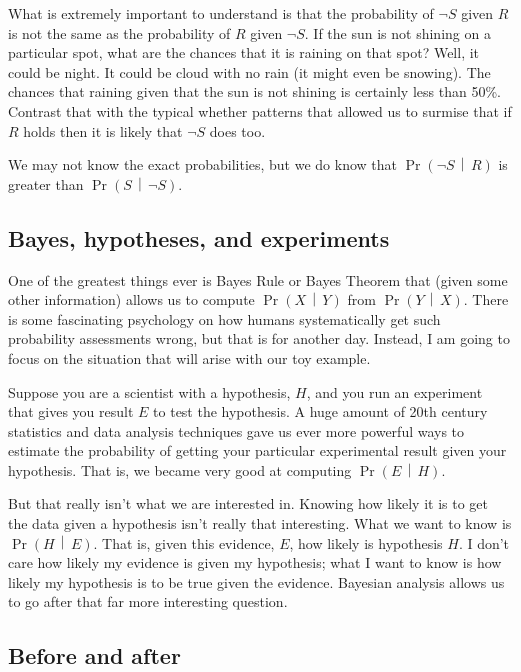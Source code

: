 \documentclass[11pt]{article}
\newcommand{\prob}[1]{\ensuremath{\operatorname{Pr}\left( #1 \right)}}
\newcommand{\condprob}[2]{\prob{#1\, \middle|\, #2}}
\begin{document}
What is extremely important to understand is that the probability of $\neg S$ given $R$ is not the same as the probability of $R$ given $\neg S$.
If the sun is not shining on a particular spot, what are the chances that it is raining on that spot? Well, it could be night. It could be cloud with no rain (it might even be snowing).
The chances that raining given that the sun is not shining is certainly less than 50\%. 
Contrast that with the typical whether patterns that allowed us to surmise that if $R$ holds then it is likely that $\neg S$ does too.

We may not know the exact probabilities, but we do know that \condprob{\neg S}{R} is greater than \condprob{S}{\neg S}.

\subsection{Bayes, hypotheses, and experiments}

One of the greatest things ever is Bayes Rule or Bayes Theorem that (given some other information) allows us to compute \condprob{X}{Y} from \condprob{Y}{X}.
There is some fascinating psychology on how humans systematically get such probability assessments wrong, but that is for another day. Instead, I am going to focus on the situation that will arise with our toy example.

Suppose you are a scientist with a hypothesis, $H$, and you run an experiment that gives you result $E$ to test the hypothesis. A huge amount of 20th century statistics and data analysis techniques gave us ever more powerful ways to estimate the probability of getting your particular experimental result given your hypothesis. That is, we became very good at computing \condprob{E}{H}.

But that really isn't what we are interested in.
Knowing how likely it is to get the data given a hypothesis isn't really that interesting.
What we want to know is \condprob{H}{E}. That is, given this evidence, $E$, how likely is hypothesis $H$. I don't care how likely my evidence is given my hypothesis; what I want to know is how likely my hypothesis is to be true given the evidence. Bayesian analysis allows us to go after that far more interesting question.

\subsection{Before and after}
\end{document}

